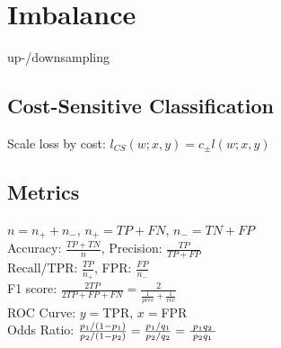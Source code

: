 \section*{Imbalance}

up-/downsampling

\subsection*{Cost-Sensitive Classification}
Scale loss by cost: $l_{CS}(w;x,y) = c_\pm l(w;x,y)$

\subsection*{Metrics}
$n = n_+ + n_-$, $n_+ = TP + FN$, $n_- = TN + FP$\\
Accuracy: $\frac{TP+TN}{n}$, 
Precision: $\frac{TP}{TP+FP}$\\ 
Recall/TPR: $\frac{TP}{n_+}$, 
FPR: $ \frac{FP}{n_-}$\\
F1 score: $\frac{2TP}{2TP+FP+FN} = \frac{2}{\frac{1}{prec} + \frac{1}{rec}}$\\
ROC Curve: $y = $TPR, $x = $FPR\\
Odds Ratio: ${p_{1}/(1-p_{1}) \over p_{2}/(1-p_{2})}={p_{1}/q_{1} \over p_{2}/q_{2}}={\frac  {\;p_{1}q_{2}\;}{\;p_{2}q_{1}\;}}$